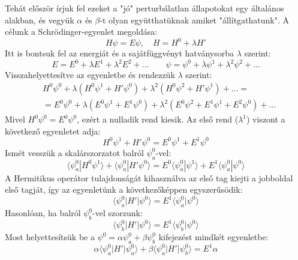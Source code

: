\documentclass[../main.tex]{subfiles}
\begin{document}
Tehát először írjuk fel ezeket a "jó" perturbálatlan állapotokat egy általános alakban, és vegyük $\alpha$ és $\beta$-t olyan együtthatüknak amiket "állítgathatunk". A célunk a Schrödinger-egyenlet megoldása:
\begin{equation}
    H \psi = E \psi, \quad H = H^0 + \lambda H'
\end{equation}
Itt is bontsuk fel az energiát és a sajátfüggvényt hatványsorba $\lambda$ szerint:
\begin{equation}
    E = E^0 + \lambda E^1 + \lambda^2 E^2 + ... \qquad \psi = \psi^0 + \lambda \psi^1 + \lambda^2 \psi^2 + ...
\end{equation}
Visszahelyettesítve az egyenletbe és rendezzük $\lambda$ szerint:
\begin{equation}
    \begin{aligned}
        &H^0 \psi^0 + \lambda \left( H^0 \psi^1 + H' \psi^0 \right) + \lambda^2 \left( H^0 \psi^2 + H' \psi^1 \right) + ... = \\
        &= E^0 \psi^0 + \lambda \left( E^0 \psi^1 + E^1 \psi^0 \right) + \lambda^2 \left( E^0 \psi^2 + E^1 \psi^1 + E^2 \psi^0 \right) + ...
    \end{aligned}
\end{equation}
Mivel $H^0 \psi^0 = E^0 \psi^0$, ezért a nulladik rend kiesik. Az első rend ($\lambda^1$) viszont a következő egyenletet adja:
\begin{equation}
    H^0 \psi^1 + H' \psi^0 = E^0 \psi^1 + E^1 \psi^0
\end{equation}
Ismét vesszük a skalárszorzatot balról $\psi_a^{0}$-vel:
\begin{equation}
    \langle \psi_a^0 | H^0 \psi^1 \rangle + \langle \psi_a^0 | H' \psi^0 \rangle = E^0 \langle \psi_a^0 | \psi^1 \rangle + E^1 \langle \psi_a^0 | \psi^0 \rangle
\end{equation}
A Hermitikus operátor tulajdonságát kihasználva az első tag kiejti a jobboldal első tagját, így az egyenletünk a következőképpen egyszerűsödik:
\begin{equation}
    \langle \psi_a^0 | H' | \psi^0 \rangle = E^1 \langle \psi_a^0 | \psi^0 \rangle
\end{equation}
Hasonlóan, ha balról $\psi_b^{0}$-vel szorzunk:
\begin{equation}
    \langle \psi_b^0 | H' | \psi^0 \rangle = E^1 \langle \psi_b^0 | \psi^0 \rangle
\end{equation}
Most helyettesítsük be a $\psi^0 = \alpha \psi_a^0 + \beta \psi_b^0$ kifejezést mindkét egyenletbe:
\begin{equation}
    \alpha \langle \psi_a^0 | H' | \psi_a^0 \rangle + \beta \langle \psi_a^0 | H' | \psi_b^0 \rangle = E^1 \alpha
\end{equation}
\end{document}
